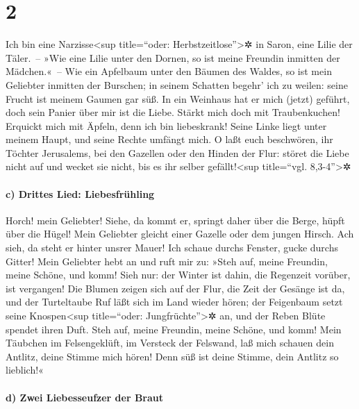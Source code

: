 \hypertarget{section-1}{%
\section{2}\label{section-1}}

Ich bin eine Narzisse\textless sup title=``oder:
Herbstzeitlose''\textgreater✲ in Saron, eine Lilie der Täler.~--
»Wie eine Lilie unter den Dornen, so ist meine Freundin
inmitten der Mädchen.«~-- Wie ein Apfelbaum unter den
Bäumen des Waldes, so ist mein Geliebter inmitten der Burschen; in
seinem Schatten begehr' ich zu weilen: seine Frucht ist meinem Gaumen
gar süß. In ein Weinhaus hat er mich (jetzt) geführt, doch
sein Panier über mir ist die Liebe. Stärkt mich doch mit
Traubenkuchen! Erquickt mich mit Äpfeln, denn ich bin liebeskrank!
Seine Linke liegt unter meinem Haupt, und seine Rechte
umfängt mich. O laßt euch beschwören, ihr Töchter
Jerusalems, bei den Gazellen oder den Hinden der Flur: störet die Liebe
nicht auf und wecket sie nicht, bis es ihr selber gefällt!\textless sup
title=``vgl. 8,3-4''\textgreater✲

\hypertarget{c-drittes-lied-liebesfruxfchling}{%
\paragraph{c) Drittes Lied:
Liebesfrühling}\label{c-drittes-lied-liebesfruxfchling}}

Horch! mein Geliebter! Siehe, da kommt er, springt daher
über die Berge, hüpft über die Hügel! Mein Geliebter
gleicht einer Gazelle oder dem jungen Hirsch. Ach sieh, da steht er
hinter unsrer Mauer! Ich schaue durchs Fenster, gucke durchs Gitter!
Mein Geliebter hebt an und ruft mir zu: »Steh auf, meine
Freundin, meine Schöne, und komm! Sieh nur: der Winter
ist dahin, die Regenzeit vorüber, ist vergangen! Die
Blumen zeigen sich auf der Flur, die Zeit der Gesänge ist da, und der
Turteltaube Ruf läßt sich im Land wieder hören; der
Feigenbaum setzt seine Knospen\textless sup title=``oder:
Jungfrüchte''\textgreater✲ an, und der Reben Blüte spendet ihren Duft.
Steh auf, meine Freundin, meine Schöne, und komm! Mein
Täubchen im Felsengeklüft, im Versteck der Felswand, laß mich schauen
dein Antlitz, deine Stimme mich hören! Denn süß ist deine Stimme, dein
Antlitz so lieblich!«

\hypertarget{d-zwei-liebesseufzer-der-braut}{%
\paragraph{d) Zwei Liebesseufzer der
Braut}\label{d-zwei-liebesseufzer-der-braut}}

